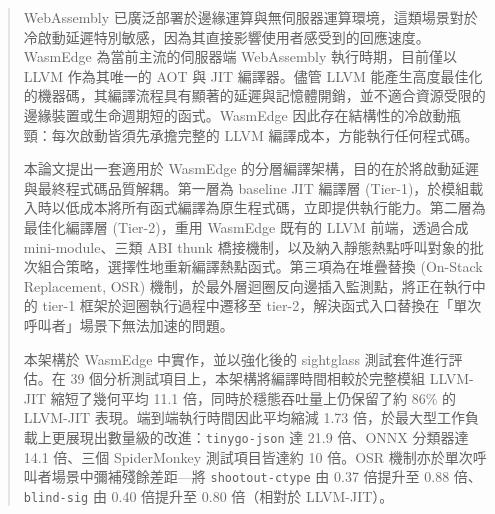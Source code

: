 
\begin{abstract}

WebAssembly 已廣泛部署於邊緣運算與無伺服器運算環境，這類場景對於冷啟動延遲特別敏感，因為其直接影響使用者感受到的回應速度。WasmEdge 為當前主流的伺服器端 WebAssembly 執行時期，目前僅以 LLVM 作為其唯一的 AOT 與 JIT 編譯器。儘管 LLVM 能產生高度最佳化的機器碼，其編譯流程具有顯著的延遲與記憶體開銷，並不適合資源受限的邊緣裝置或生命週期短的函式。WasmEdge 因此存在結構性的冷啟動瓶頸：每次啟動皆須先承擔完整的 LLVM 編譯成本，方能執行任何程式碼。

本論文提出一套適用於 WasmEdge 的分層編譯架構，目的在於將啟動延遲與最終程式碼品質解耦。第一層為 baseline JIT 編譯層 (Tier-1)，於模組載入時以低成本將所有函式編譯為原生程式碼，立即提供執行能力。第二層為最佳化編譯層 (Tier-2)，重用 WasmEdge 既有的 LLVM 前端，透過合成 mini-module、三類 ABI thunk 橋接機制，以及納入靜態熱點呼叫對象的批次組合策略，選擇性地重新編譯熱點函式。第三項為在堆疊替換 (On-Stack Replacement, OSR) 機制，於最外層迴圈反向邊插入監測點，將正在執行中的 tier-1 框架於迴圈執行過程中遷移至 tier-2，解決函式入口替換在「單次呼叫者」場景下無法加速的問題。

本架構於 WasmEdge 中實作，並以強化後的 sightglass 測試套件進行評估。在 39 個分析測試項目上，本架構將編譯時間相較於完整模組 LLVM-JIT 縮短了幾何平均 11.1 倍，同時於穩態吞吐量上仍保留了約 86\% 的 LLVM-JIT 表現。端到端執行時間因此平均縮減 1.73 倍，於最大型工作負載上更展現出數量級的改進：\texttt{tinygo-json} 達 21.9 倍、ONNX 分類器達 14.1 倍、三個 SpiderMonkey 測試項目皆達約 10 倍。OSR 機制亦於單次呼叫者場景中彌補殘餘差距---將 \texttt{shootout-ctype} 由 0.37 倍提升至 0.88 倍、\texttt{blind-sig} 由 0.40 倍提升至 0.80 倍（相對於 LLVM-JIT）。

\end{abstract}


